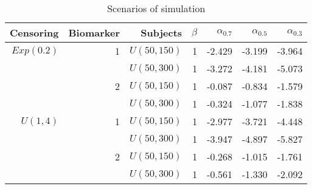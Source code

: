 \begin{table}[!htb]

\caption{\label{tab:set}Scenarios of simulation}
\centering
\begin{tabular}[t]{rrrrrrr}
\toprule
Censoring & Biomarker & Subjects & $\beta$ & $\alpha_{0.7}$ & $\alpha_{0.5}$ & $\alpha_{0.3}$\\
\midrule
$Exp(0.2)$ & 1 & $U(50,150)$ & 1 & -2.429 & -3.199 & -3.964\\
 &  & $U(50,300)$ & 1 & -3.272 & -4.181 & -5.073\\
 & 2 & $U(50,150)$ & 1 & -0.087 & -0.834 & -1.579\\
 &  & $U(50,300)$ & 1 & -0.324 & -1.077 & -1.838\\
\addlinespace
$U(1,4)$ & 1 & $U(50,150)$ & 1 & -2.977 & -3.721 & -4.448\\
 &  & $U(50,300)$ & 1 & -3.947 & -4.897 & -5.827\\
 & 2 & $U(50,150)$ & 1 & -0.268 & -1.015 & -1.761\\
 &  & $U(50,300)$ & 1 & -0.561 & -1.330 & -2.092\\
\bottomrule
\end{tabular}
\end{table}
